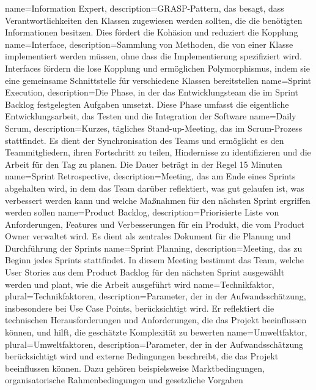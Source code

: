 {
    name={Information Expert},
    description={GRASP-Pattern, das besagt, dass Verantwortlichkeiten den Klassen zugewiesen werden sollten, die die benötigten Informationen besitzen. Dies fördert die Kohäsion und reduziert die Kopplung}
}
{
    name={Interface},
    description={Sammlung von Methoden, die von einer Klasse implementiert werden müssen, ohne dass die Implementierung spezifiziert wird. Interfaces fördern die lose Kopplung und ermöglichen Polymorphismus, indem sie eine gemeinsame Schnittstelle für verschiedene Klassen bereitstellen}
}
{
    name={Sprint Execution},
    description={Die Phase, in der das Entwicklungsteam die im Sprint Backlog festgelegten Aufgaben umsetzt. Diese Phase umfasst die eigentliche Entwicklungsarbeit, das Testen und die Integration der Software}
}
{
    name={Daily Scrum},
    description={Kurzes, tägliches Stand-up-Meeting, das im Scrum-Prozess stattfindet. Es dient der Synchronisation des Teams und ermöglicht es den Teammitgliedern, ihren Fortschritt zu teilen, Hindernisse zu identifizieren und die Arbeit für den Tag zu planen. Die Dauer beträgt in der Regel 15 Minuten}
}
{
    name={Sprint Retrospective},
    description={Meeting, das am Ende eines Sprints abgehalten wird, in dem das Team darüber reflektiert, was gut gelaufen ist, was verbessert werden kann und welche Maßnahmen für den nächsten Sprint ergriffen werden sollen}
}
{
    name={Product Backlog},
    description={Priorisierte Liste von Anforderungen, Features und Verbesserungen für ein Produkt, die vom Product Owner verwaltet wird. Es dient als zentrales Dokument für die Planung und Durchführung der Sprints}
}
{
    name={Sprint Planning},
    description={Meeting, das zu Beginn jedes Sprints stattfindet. In diesem Meeting bestimmt das Team, welche User Stories aus dem Product Backlog für den nächsten Sprint ausgewählt werden und plant, wie die Arbeit ausgeführt wird}
}
{
    name={Technikfaktor},
    plural={Technikfaktoren},
    description={Parameter, der in der Aufwandsschätzung, insbesondere bei Use Case Points, berücksichtigt wird. Er reflektiert die technischen Herausforderungen und Anforderungen, die das Projekt beeinflussen können, und hilft, die geschätzte Komplexität zu bewerten}
}
{
    name={Umweltfaktor},
    plural={Umweltfaktoren},
    description={Parameter, der in der Aufwandsschätzung berücksichtigt wird und externe Bedingungen beschreibt, die das Projekt beeinflussen können. Dazu gehören beispielsweise Marktbedingungen, organisatorische Rahmenbedingungen und gesetzliche Vorgaben}
}
